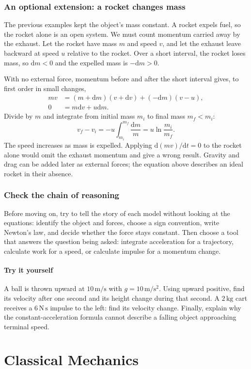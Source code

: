 \documentclass[11pt,oneside]{book}
\newcommand{\dd}{\mathrm{d}}
\theoremstyle{reviewstyle}
\newcommand{\learningcheck}[1]{\subsection*{Try it yourself}\noindent #1\par}
\begin{document}
\section{An optional extension: a rocket changes mass}
The previous examples kept the object's mass constant. A rocket expels fuel, so the rocket alone is an open system. We must count momentum carried away by the exhaust. Let the rocket have mass $m$ and speed $v$, and let the exhaust leave backward at speed $u$ relative to the rocket. Over a short interval, the rocket loses mass, so $\dd m<0$ and the expelled mass is $-\dd m>0$.

With no external force, momentum before and after the short interval gives, to first order in small changes,
\begin{align}
mv&=(m+\dd m)(v+\dd v)+(-\dd m)(v-u),\\
0&=m\dd v+u\dd m.
\end{align}
Divide by $m$ and integrate from initial mass $m_i$ to final mass $m_f<m_i$:
\begin{equation}
v_f-v_i=-u\int_{m_i}^{m_f}\frac{\dd m}{m}
=u\ln\frac{m_i}{m_f}.
\end{equation}
The speed increases as mass is expelled. Applying $\dd(mv)/\dd t=0$ to the rocket alone would omit the exhaust momentum and give a wrong result. Gravity and drag can be added later as external forces; the equation above describes an ideal rocket in their absence.

\section*{Check the chain of reasoning}
Before moving on, try to tell the story of each model without looking at the equations: identify the object and forces, choose a sign convention, write Newton's law, and decide whether the force stays constant. Then choose a tool that answers the question being asked: integrate acceleration for a trajectory, calculate work for a speed, or calculate impulse for a momentum change.

\learningcheck{A ball is thrown upward at $10\,\mathrm{m/s}$ with $g=10\,\mathrm{m/s^2}$. Using upward positive, find its velocity after one second and its height change during that second. A $2\,\mathrm{kg}$ cart receives a $6\,\mathrm{N\,s}$ impulse to the left: find its velocity change. Finally, explain why the constant-acceleration formula cannot describe a falling object approaching terminal speed.}

\part{Classical Mechanics}
\end{document}
